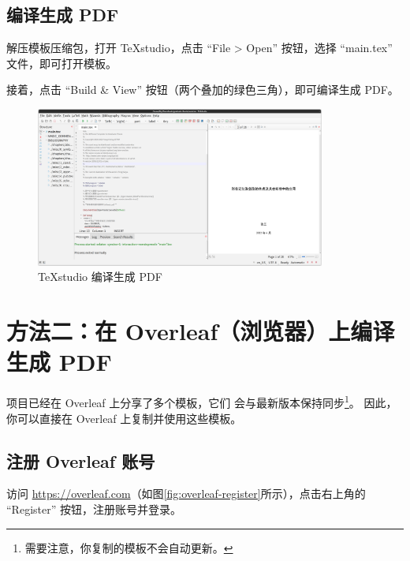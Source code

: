 \subsection{编译生成 PDF}

解压模板压缩包，打开 TeXstudio，点击 ``File > Open'' 按钮，选择 ``main.tex'' 文件，即可打开模板。

接着，点击 ``Build \& View'' 按钮（两个叠加的绿色三角），即可编译生成 PDF。

\begin{figure}[H]
  \begin{center}
    \includegraphics[width=0.85\textwidth]{imgs/texstudio-compile-and-view.png}
  \end{center}
  \caption{TeXstudio 编译生成 PDF}
  \label{fig:texstudio-compile-and-view}
\end{figure}

\section{方法二：在 Overleaf（浏览器）上编译生成 PDF}
\label{sec:overleaf-compile}

\BIThesis 项目已经在 Overleaf 上分享了多个模板，它们
会与最新版本保持同步\footnote{需要注意，你复制的模板不会自动更新。}。
因此，你可以直接在 Overleaf 上复制并使用这些模板。

\subsection{注册 Overleaf 账号}

访问 \url{https://overleaf.com}（如图\ref{fig:overleaf-register}所示），点击右上角的 ``Register'' 按钮，注册账号并登录。

